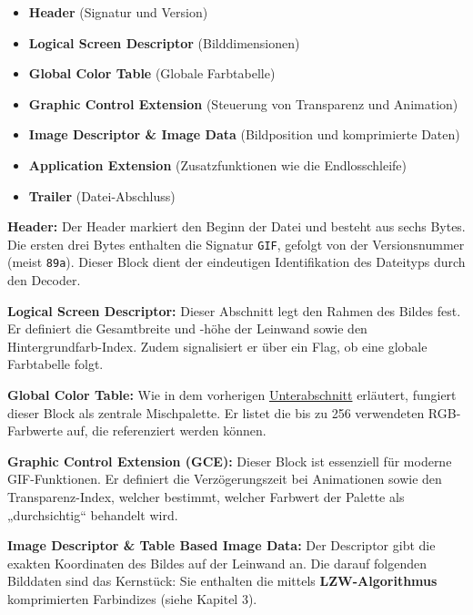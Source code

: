 \documentclass[a4paper,11pt]{scrartcl}
\theoremstyle{definition} %
\begin{document}
\begin{itemize}
    \item \textbf{Header} (Signatur und Version)
    \item \textbf{Logical Screen Descriptor} (Bilddimensionen)
    \item \textbf{Global Color Table} (Globale Farbtabelle)
    \item \textbf{Graphic Control Extension} (Steuerung von Transparenz und Animation)
    \item \textbf{Image Descriptor \& Image Data} (Bildposition und komprimierte Daten)
    \item \textbf{Application Extension} (Zusatzfunktionen wie die Endlosschleife)
    \item \textbf{Trailer} (Datei-Abschluss)
\end{itemize}

\vspace{1em}

\noindent \textbf{Header:}
Der Header markiert den Beginn der Datei und besteht aus sechs Bytes. Die ersten drei Bytes enthalten die Signatur \texttt{GIF}, gefolgt von der Versionsnummer (meist \texttt{89a}). Dieser Block dient der eindeutigen Identifikation des Dateityps durch den Decoder.

\bigskip

\noindent \textbf{Logical Screen Descriptor:}
Dieser Abschnitt legt den \glqq Rahmen\grqq{} des Bildes fest. Er definiert die Gesamtbreite und -höhe der Leinwand sowie den Hintergrundfarb-Index. Zudem signalisiert er über ein Flag, ob eine globale Farbtabelle folgt.

\bigskip

\noindent \textbf{Global Color Table:}
Wie in dem vorherigen \hyperref[tab:farbpalette]{Unterabschnitt} erläutert, fungiert dieser Block als zentrale \glqq Mischpalette\grqq{}. Er listet die bis zu 256 verwendeten RGB-Farbwerte auf, die referenziert werden können.

\bigskip

\noindent \textbf{Graphic Control Extension (GCE):}
Dieser Block ist essenziell für moderne GIF-Funktionen. Er definiert die Verzögerungszeit bei Animationen sowie den Transparenz-Index, welcher bestimmt, welcher Farbwert der Palette als „durchsichtig“ behandelt wird.

\bigskip

\noindent \textbf{Image Descriptor \& Table Based Image Data:}
Der Descriptor gibt die exakten Koordinaten des Bildes auf der Leinwand an. Die darauf folgenden Bilddaten sind das Kernstück: Sie enthalten die mittels \textbf{LZW-Algorithmus} komprimierten Farbindizes (siehe Kapitel 3).
\end{document}
